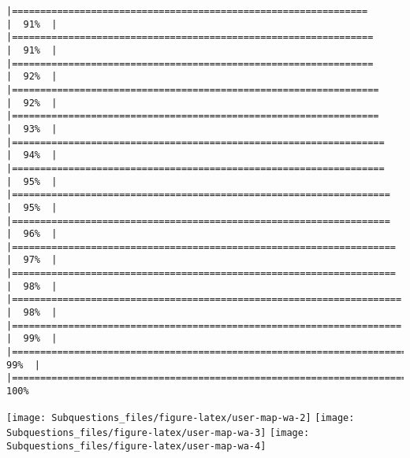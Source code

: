 \documentclass[
]{article}
\begin{document}
\begin{verbatim}
|===============================================================       |  91%  |                                                                              |================================================================      |  91%  |                                                                              |================================================================      |  92%  |                                                                              |=================================================================     |  92%  |                                                                              |=================================================================     |  93%  |                                                                              |==================================================================    |  94%  |                                                                              |==================================================================    |  95%  |                                                                              |===================================================================   |  95%  |                                                                              |===================================================================   |  96%  |                                                                              |====================================================================  |  97%  |                                                                              |====================================================================  |  98%  |                                                                              |===================================================================== |  98%  |                                                                              |===================================================================== |  99%  |                                                                              |======================================================================|  99%  |                                                                              |======================================================================| 100%
\end{verbatim}

\texttt{[image: Subquestions\_files/figure-latex/user-map-wa-2]}
\texttt{[image: Subquestions\_files/figure-latex/user-map-wa-3]}
\texttt{[image: Subquestions\_files/figure-latex/user-map-wa-4]}
\end{document}
